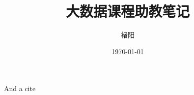 \documentclass[12pt,a4paper]{report}
\title{大数据课程助教笔记}
\author{褚阳}
\date{\today}
\begin{document}
\maketitle

\tableofcontents
\listoftables
\listoffigures




And a cite \cite{Erişti20104094}


{}
\end{document}
